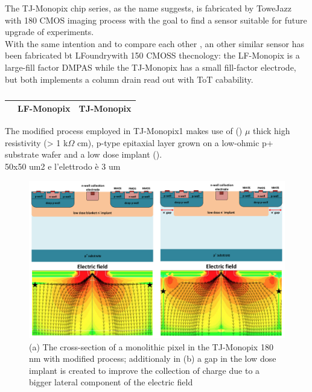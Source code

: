 
The TJ-Monopix chip series, as the name suggests, is fabricated by ToweJazz with 180 CMOS imaging process with the goal to find a sensor suitable for future upgrade of experiments.\\
With the same intention and to compare each other \cite{LF-TJ-Monopix}, an other similar sensor has been fabricated bt LFoundrywith 150 CMOSS thecnology: the LF-Monopix is a large-fill factor DMPAS while the TJ-Monopix has a small fill-factor electrode, but both implements a column drain read out with ToT cabability.


\begin{table}
    \begin{center}
    \begin{tabular}{|c | c |c |}
    \hline
    & LF-Monopix & TJ-Monopix\\
    \hline
    \hline

    \hline
    \end{tabular}
    \caption{}
    \label{tab:LF-TJ-Monopix}
    \end{center}
 \end{table}
The modified process employed in TJ-Monopix1 makes use of () $\mu$  thick high resistivity (> 1 k$\Omega$ cm), p-type epitaxial layer grown on a low-ohmic p+ substrate wafer and a low dose implant ().\\

50x50 um2 e l'elettrodo è 3 um

\begin{figure}[h!]
    \centering
    \includegraphics[width=.9\linewidth]{figures/Monopix1/Monopix1_section_scheme.png}
    \caption{(a) The cross-section of a monolithic pixel in the TJ-Monopix 180 nm with modified process; additionaly in (b) a gap in the low dose implant is created to improve the collection of charge due to a bigger lateral component of the electric field}
    \label{fig:Monopix1_section_scheme}
 \end{figure}


